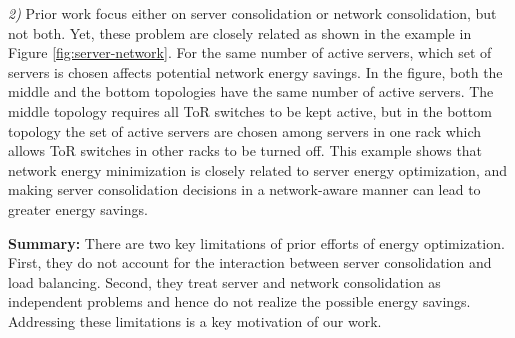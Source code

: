 {{\em 2)} Prior work focus either on server consolidation or network consolidation, but not both. Yet, these problem are closely related as shown in the example in Figure \ref{fig:server-network}. For the same number of active servers, which set of servers is chosen affects potential network energy savings. In the figure, both the middle and the bottom topologies  have the same number of active servers.  The middle topology requires all ToR switches to be kept active, but in the bottom topology the set of active servers are chosen among  servers in one rack which allows ToR switches in other racks to be turned off.  This example shows that network energy minimization is closely related to server energy optimization, and making server consolidation decisions in a network-aware manner can lead to greater energy savings.

\textbf{Summary:} There are two key limitations of prior efforts of energy optimization. First, they do not account for the interaction between server consolidation and load balancing. Second, they treat server and network consolidation as independent problems and hence do not realize the possible energy savings. Addressing these limitations is a key motivation of our work.
}